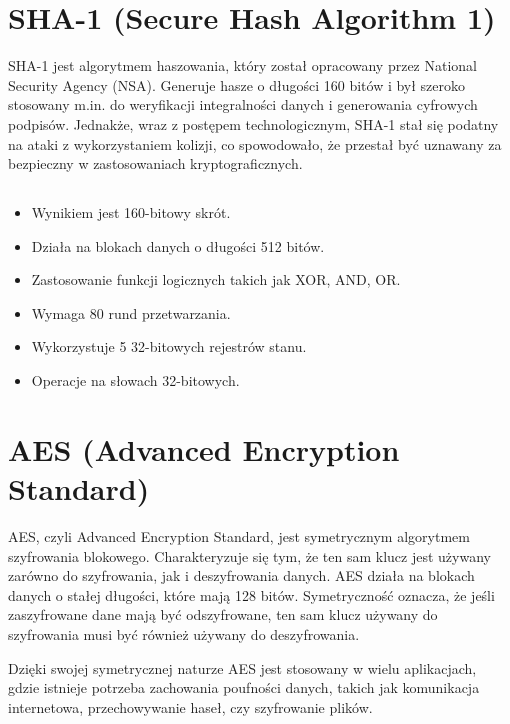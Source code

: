 \documentclass{article}
\begin{document}
    \begin{enumerate}
    
\section*{SHA-1 (Secure Hash Algorithm 1)}
    SHA-1 jest algorytmem haszowania, który został opracowany przez National Security Agency (NSA). Generuje hasze o długości 160 bitów i był szeroko stosowany m.in. do weryfikacji integralności danych i generowania cyfrowych podpisów. Jednakże, wraz z postępem technologicznym, SHA-1 stał się podatny na ataki z wykorzystaniem kolizji, co spowodowało, że przestał być uznawany za bezpieczny w zastosowaniach kryptograficznych.

    \subsection*{}
    \begin{itemize}
        \item Wynikiem jest 160-bitowy skrót.
        \item Działa na blokach danych o długości 512 bitów.
        \item Zastosowanie funkcji logicznych takich jak XOR, AND, OR.
        \item Wymaga 80 rund przetwarzania.
        \item Wykorzystuje 5 32-bitowych rejestrów stanu.
        \item Operacje na słowach 32-bitowych.
    \end{itemize}

\section*{AES (Advanced Encryption Standard)}

    AES, czyli Advanced Encryption Standard, jest symetrycznym algorytmem szyfrowania blokowego. Charakteryzuje się tym, że ten sam klucz jest używany zarówno do szyfrowania, jak i deszyfrowania danych. AES działa na blokach danych o stałej długości, które mają 128 bitów. Symetryczność oznacza, że jeśli zaszyfrowane dane mają być odszyfrowane, ten sam klucz używany do szyfrowania musi być również używany do deszyfrowania.

    Dzięki swojej symetrycznej naturze AES jest stosowany w wielu aplikacjach, gdzie istnieje potrzeba zachowania poufności danych, takich jak komunikacja internetowa, przechowywanie haseł, czy szyfrowanie plików. 

\end{enumerate}
\end{document}
